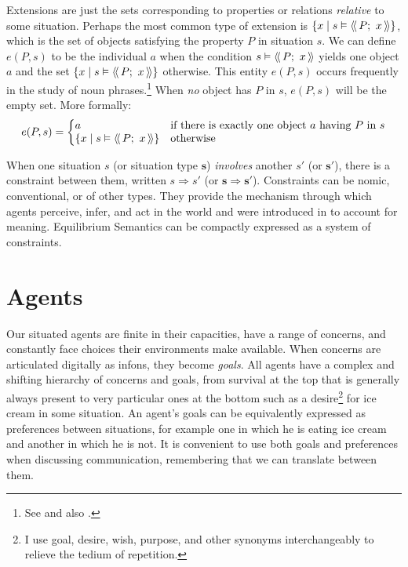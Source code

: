 Extensions are just the sets corresponding to properties or relations \emph{relative} to some situation. Perhaps the most common type of extension is $\{x \mid s \vDash \soa{P;\ x}\}$, which is the set of objects satisfying the property $P$ in situation $s$. We can define $e(P,s)$ \label{page:e(P,s)} to be the individual $a$ when the condition $s \vDash \soa{P;\ x}$ yields one object $a$ and the set $\{x \mid s \vDash \soa{P;\ x}\}$ otherwise. This entity $e(P,s)$ occurs frequently in the study of noun phrases.\footnote{See  and also \citet[Chapter~6]{parikh:le}.} When \emph{no} object has $P$ in $s$, $e(P,s)$ will be the empty set. More formally:
\begin{equation}
e(P,s) = \left\{\begin{array}{@{}ll@{}}
a & \mbox{if there is exactly one object $a$ having $P$ in $s$} \\
\{x \mid s \vDash \soa{P;\ x}\} & \mbox{otherwise}
\label{eq:eps}			\end{array}
		\right.
\end{equation}

When one situation $s$ (or situation type $\mathbf{s}$) \emph{involves} another $s'$ (or $\mathbf{s'}$), there is a constraint between them, written $s \Longrightarrow s'$ (or $\mathbf{s} \Longrightarrow \mathbf{s'}$). Constraints can be nomic, conventional, or of other types. They provide the mechanism through which agents perceive, infer, and act in the world and were introduced in  to account for meaning. Equilibrium Semantics can be compactly expressed as a system of constraints.


\section{Agents} \label{sec:agents}

Our situated agents are finite in their capacities, have a range of concerns, and constantly face choices their environments make available. When concerns are articulated digitally as infons, they become \emph{goals}. All agents have a complex and shifting hierarchy of concerns and goals, from survival at the top that is generally always present to very particular ones at the bottom such as a desire\footnote{I use goal, desire, wish, purpose, and other synonyms interchangeably to relieve the tedium of repetition.} for ice cream in some situation. An agent's goals can be equivalently expressed as preferences between situations, for example one in which he is eating ice cream and another in which he is not. It is convenient to use both goals and preferences when discussing communication, remembering that we can translate between them. 

